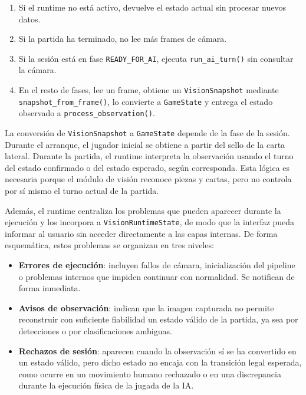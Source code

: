 \begin{enumerate}
    \item Si el runtime no está activo, devuelve el estado actual sin procesar nuevos datos.
    \item Si la partida ha terminado, no lee más frames de cámara.
    \item Si la sesión está en fase \texttt{READY\_FOR\_AI}, ejecuta \texttt{run\_ai\_turn()} sin consultar la cámara.
    \item En el resto de fases, lee un frame, obtiene un \texttt{VisionSnapshot} mediante \texttt{snapshot\_from\_frame()}, lo convierte a \texttt{GameState} y entrega el estado observado a \texttt{process\_observation()}.
\end{enumerate}

La conversión de \texttt{VisionSnapshot} a \texttt{GameState} depende de la fase de la sesión. Durante el arranque, el jugador inicial se obtiene a partir del sello de la carta lateral. Durante la partida, el runtime interpreta la observación usando el turno del estado confirmado o del estado esperado, según corresponda. Esta lógica es necesaria porque el módulo de visión reconoce piezas y cartas, pero no controla por sí mismo el turno actual de la partida.

Además, el runtime centraliza los problemas que pueden aparecer durante la ejecución y los incorpora a \texttt{VisionRuntimeState}, de modo que la interfaz pueda informar al usuario sin acceder directamente a las capas internas. De forma esquemática, estos problemas se organizan en tres niveles:

\begin{itemize}
    \item \textbf{Errores de ejecución}: incluyen fallos de cámara, inicialización del pipeline o problemas internos que impiden continuar con normalidad. Se notifican de forma inmediata.
    \item \textbf{Avisos de observación}: indican que la imagen capturada no permite reconstruir con suficiente fiabilidad un estado válido de la partida, ya sea por detecciones o por clasificaciones ambiguas.
    \item \textbf{Rechazos de sesión}: aparecen cuando la observación sí se ha convertido en un estado válido, pero dicho estado no encaja con la transición legal esperada, como ocurre en un movimiento humano rechazado o en una discrepancia durante la ejecución física de la jugada de la IA.
\end{itemize}

